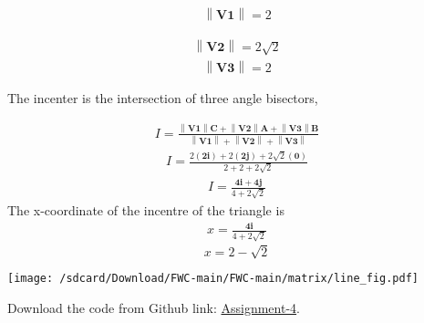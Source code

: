 \documentclass[10pt,a4paper]{report}
\providecommand{\norm}[1]{\left\lVert#1\right\rVert}
\let\vec\mathbf
\begin{document}
\begin{multicols}{2}
 
\begin{align}
\norm{\vec{V1}}=2
\end{align}

\begin{align}
{\norm{\vec{V2}}}=2\sqrt{2} 
\end{align}
\begin{align}
\norm{\vec{V3}}=2
\end{align}



The incenter is the intersection of three angle bisectors,

\begin{align}
I=\frac{\norm{\vec{V1}}{\vec{C}}+\norm{\vec{V2}}{\vec{A}}+\norm{\vec{V3}}{\vec{B}}}{\norm{\vec{V1}}+\norm{\vec{V2}}+\norm{\vec{V3}}}
\end{align}
\begin{align*}
I=\frac{2({\vec{2i}})+2({\vec{2j}})+2\sqrt{2}({\vec{0}})}{2+2+2\sqrt{2}}
\end{align*}
\begin{align*}
I=\frac{\vec{4i+4j}}{4+2\sqrt{2}}
\end{align*}	 
The x-coordinate of the incentre of the triangle is
\begin{align*}
x=\frac{\vec{4i}}{4+2\sqrt{2}}
\end{align*}	 
\begin{equation}
x=2-\sqrt{2}
\end{equation}
\begin{center}
 \texttt{[image: /sdcard/Download/FWC-main/FWC-main/matrix/line\_fig.pdf]}  
 \end{center} 
 
\raggedright  Download the code from  
Github link: \href{https://github.com/Prathyushakorepu/FWC/tree/main/Matrix/Line_assignment}{Assignment-4}.
  \end{multicols}
\end{document}
